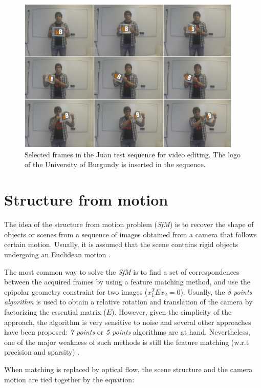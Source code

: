    \begin{figure}[tpbh]
      \centering
      \includegraphics[width=0.95\textwidth]{../images/longUB.png}
      \caption{  Selected frames in the Juan test sequence for video editing. The logo of the University of Burgundy is inserted in the sequence. }
      \label{pt_seg2}
   \end{figure}

\section{Structure from motion}

The idea of the structure from motion problem ({\it SfM}) is to 
recover the shape of objects or scenes from a sequence of images obtained from a camera that follows certain motion. Usually, it is assumed that 
the scene contains rigid objects undergoing an 
Euclidean motion \cite{c43}.

The most common way to solve the {\it SfM} is to 
find a set of correspondences between the acquired 
frames by using a feature matching method, and use the epipolar geometry constraint for two images 
($x_1^T E x_2 = 0$). Usually, the {\it 8 points algorithm} is used to obtain a relative rotation 
and translation of the camera by factorizing the 
essential matrix ($E$). However, given the simplicity of the approach, the algorithm is very sensitive to noise and several other approaches have 
been proposed: {\it 7 points} or {\it 5 points} algorithms are at hand. Nevertheless, one of the major weakness of such 
methods is still the feature matching (w.r.t precision and sparsity) \cite{c43}. 

When matching is replaced by optical flow, the 
scene structure and the camera motion are tied 
together by the equation:


